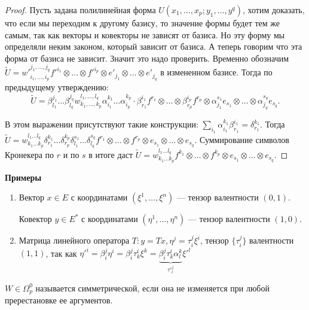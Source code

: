 \begin{proof}
	Пусть задана полилинейная форма $U(x_1, \ldots, x_p; y_1, \ldots, y^q)$, хотим доказать, что если мы переходим к другому базису, то значение формы будет тем же самым, так как векторы и ковекторы не зависят от базиса. Но эту форму мы определяли неким законом, который зависит от базиса. А теперь говорим что эта форма от базиса не зависит. Значит это надо проверить. Временно обозначим $\widetilde{U} = {w'}_{i_1, \ldots, i_p}^{j_1, \ldots, j_q}{f'}^{i_1}\otimes\ldots\otimes {f'}^{i_p}\otimes {e'}_{j_1}\otimes\ldots\otimes {e'}_{j_q}$ в измененном базисе. Тогда по предыдущему утверждению: $$\widetilde{U} = \beta_{l_1}^{j_1}\ldots\beta_{l_q}^{j_q}{w}_{k_1, \ldots, k_p}^{l_1, \ldots, l_q}\alpha_{i_1}^{k_1}\ldots\alpha_{i_p}^{k_p}\cdot\beta^{i_1}_{r_1}f^{r_1}\otimes\ldots\otimes\beta^{i_p}_{r_p}f^{r_p}\otimes\alpha_{j_1}^{s_1}e_{s_1}\otimes\ldots\otimes\alpha_{j_q}^{s_q}e_{s_q}.$$
	
	В этом выражении присутствуют такие конструкции: $\sum\limits_{i_1}\alpha_{i_1}^{k_1}\beta_{r_1}^{i_1} = \delta_{r_1}^{k_1}$. Тогда\\ $\widetilde{U} = w_{k_1\ldots k_p}^{l_1\ldots l_q}\delta_{r_1}^{k_1}\ldots\delta_{r_p}^{k_p}\delta_{l_1}^{s_1}\ldots\delta_{l_q}^{s_q}f^{r_1}\otimes\ldots\otimes f^{r_p}\otimes e_{s_1}\otimes\ldots\otimes e_{s_q}$. Суммирование символов Кронекера по $r$ и по $s$ в итоге даст $\widetilde{U} = w_{k_1\ldots k_p}^{l_1\ldots l_q}f^{k_1}\otimes\ldots\otimes f^{k_p}\otimes e_{s_1}\otimes\ldots\otimes e_{s_q}$.
\end{proof}

\textbf{Примеры}
\begin{enumerate}
	\item Вектор $x\in E$ с координатами $(\xi^1, \ldots, \xi^n)$ --- тензор валентности $(0, 1)$.
	
	Ковектор $y\in E^*$ с координатами $(\eta^1, \ldots, \eta^n)$ --- тензор валентности $(1, 0)$.
	\item Матрица линейного оператора $T: y= Tx, \eta^j=\tau_i^j\xi^i$, тензор $\{\tau_i^j\}$ валентности $(1,1)$, так как ${\eta'}^i=\beta_i^j\eta^i=\beta_i^j\tau_k^i\xi^k=\underbrace{\beta_i^j\tau^i_k\alpha_l^k}_{{\tau'}_l^j}{\xi'}^l$
\end{enumerate}

\begin{Def}
	$W\in\Omega_p^0$ называется симметрической, если она не изменяется при любой пререстановке ее аргументов.
\end{Def}

